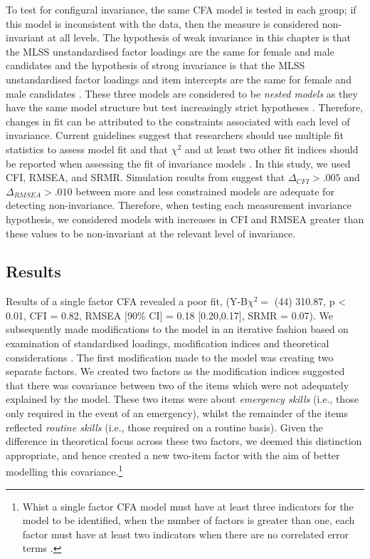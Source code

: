 \documentclass[
  12pt,
  a4paper,
]{book}
\begin{document}
To test for configural invariance, the same CFA model is tested in each group; if this model is inconsistent with the data, then the measure is considered non-invariant at all levels. The hypothesis of weak invariance in this chapter is that the MLSS unstandardised factor loadings are the same for female and male candidates and the hypothesis of strong invariance is that the MLSS unstandardised factor loadings and item intercepts are the same for female and male candidates \citep[cf.~][]{Kline2016}. These three models are considered to be \emph{nested models} as they have the same model structure but test increasingly strict hypotheses \citep{Kline2016}. Therefore, changes in fit can be attributed to the constraints associated with each level of invariance. Current guidelines suggest that researchers should use multiple fit statistics to assess model fit \citep{Kline2016} and that \(\chi^2\) and at least two other fit indices should be reported when assessing the fit of invariance models \citep{Putnick2016}. In this study, we used CFI, RMSEA, and SRMR. Simulation results from \citet{Chen2007} suggest that \(\Delta_{CFI} > .005\) and \(\Delta_{RMSEA} > .010\) between more and less constrained models are adequate for detecting non-invariance. Therefore, when testing each measurement invariance hypothesis, we considered models with increases in CFI and RMSEA greater than these values to be non-invariant at the relevant level of invariance.

\hypertarget{study-5-results}{%
\subsection{Results}\label{study-5-results}}

Results of a single factor CFA revealed a poor fit, (Y-B\(\chi^2 =\) (44) 310.87, p \textless{} 0.01, CFI = 0.82, RMSEA {[}90\% CI{]} = 0.18 {[}0.20,0.17{]}, SRMR = 0.07). We subsequently made modifications to the model in an iterative fashion based on examination of standardised loadings, modification indices and theoretical considerations \citep[cf.~][]{Biddle2001}. The first modification made to the model was creating two separate factors. We created two factors as the modification indices suggested that there was covariance between two of the items which were not adequately explained by the model. These two items were about \emph{emergency skills} (i.e., those only required in the event of an emergency), whilst the remainder of the items reflected \emph{routine skills} (i.e., those required on a routine basis). Given the difference in theoretical focus across these two factors, we deemed this distinction appropriate, and hence created a new two-item factor with the aim of better modelling this covariance.\footnote{Whist a single factor CFA model must have at least three indicators for the model to be identified, when the number of factors is greater than one, each factor must have at least two indicators when there are no correlated error terms \citep{Kline2016}.}
\end{document}
